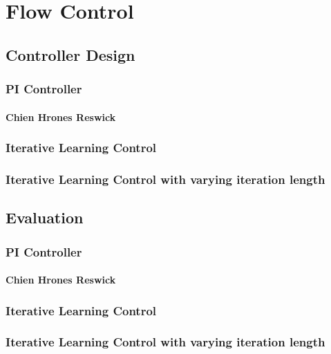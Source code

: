 \chapter{Flow Control}
\section{Controller Design}
\subsection{PI Controller}
\subsubsection{Chien Hrones Reswick}
\subsection{Iterative Learning Control}
\subsection{Iterative Learning Control with varying iteration length}

\section{Evaluation}
\subsection{PI Controller}
\subsubsection{Chien Hrones Reswick}
\subsection{Iterative Learning Control}
\subsection{Iterative Learning Control with varying iteration length}
%
%
